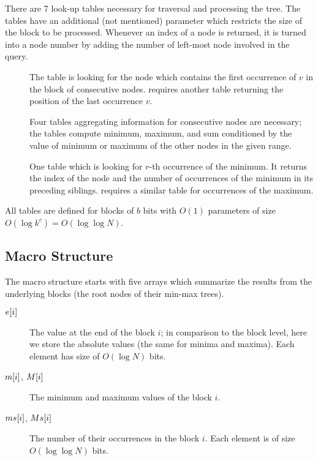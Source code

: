 There are 7 look-up tables necessary for traversal and processing the tree.
The tables have an additional (not mentioned) parameter which restricts the size of the block to be processed.
Whenever an index of a node is returned, it is turned into a node number by adding the number of left-most node involved in the query.
\begin{description}
	\item[\fwdSearch]
	The table is looking for the node which contains the first occurrence of $v$ in the block of consecutive nodes.
	\bwdSearch requires another table returning the position of the last occurrence $v$.
	
	\item[\rmqInfo]
	Four tables aggregating information for consecutive nodes are necessary; the tables compute minimum, maximum, and sum conditioned by the value of minimum or maximum of the other nodes in the given range.
	
	\item[\rmqSelect]
	One table which is looking for $r$-th occurrence of the minimum.
	It returns the index of the node and the number of occurrences of the minimum in its preceding siblings.
	\RMQSelect requires a similar table for occurrences of the maximum.
\end{description}
All tables are defined for blocks of $b$ bits with $O(1)$ parameters of size $O(\log k^c) = O(\log \log N)$.

\subsection{Macro Structure}

The macro structure starts with five arrays which summarize the results from the underlying blocks (the root nodes of their min-max trees).
\begin{description}
	\item[$e[i\char93$]
	The value at the end of the block $i$; in comparison to the block level, here we store the absolute values (the same for minima and maxima).
	Each element has size of $O(\log N)$ bits.
	
	\item[$m[i\char93$, $M[i\char93$]
	The minimum and maximum values of the block $i$.
	
	\item[$ms[i\char93$, $Ms[i\char93$]
	The number of their occurrences in the block $i$.
	Each element is of size $O(\log \log N)$ bits.
\end{description}

